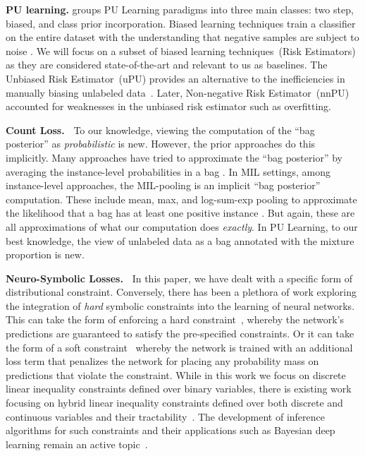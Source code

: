 \documentclass{article}
\begin{document}
\textbf{PU learning.}
\citet{bekker2020learning} groups PU Learning paradigms into three main classes: two step, biased, and class prior incorporation. Biased learning techniques train a classifier on the entire dataset with the understanding that negative samples are subject to noise \citep{bekker2020learning}. We will focus on a subset of biased learning techniques~(Risk Estimators) as they are considered state-of-the-art and relevant to us as baselines. The Unbiased Risk Estimator~(uPU) provides an alternative to the inefficiencies in manually biasing unlabeled data~\citep{plessis2014unbiased, pmlr-v37-plessis15}. Later, Non-negative Risk Estimator~(nnPU) \cite{kiryo2017positive} accounted for weaknesses in the unbiased risk estimator such as overfitting. 

\textbf{Count Loss.\ } To our knowledge, viewing the computation of the ``bag posterior'' as \emph{probabilistic} is new. However, the prior approaches do this implicitly. Many approaches have tried to approximate the ``bag posterior'' by averaging the instance-level probabilities in a bag \citep{ardehaly2017co, tsai2020learning}. In MIL settings, among instance-level approaches, the MIL-pooling is an implicit ``bag posterior'' computation. These include mean, max, and log-sum-exp pooling to approximate the likelihood that a bag has at least one positive instance \cite{wang2018revisiting}. But again, these are all approximations of what our computation does \emph{exactly}. In PU Learning, to our best knowledge, the view of unlabeled data as a bag annotated with the mixture proportion is new.

\textbf{Neuro-Symbolic Losses.\ } In this paper, we have dealt with a specific form of distributional constraint.
Conversely, there has been a plethora of work exploring the integration of \emph{hard} symbolic constraints
into the learning of neural networks.
This can take the form of enforcing a hard constraint~\citep{AhmedNeurIPS22}, whereby the network's
predictions are guaranteed to satisfy the pre-specified constraints. Or it can take the form of a soft constraint~\citep{xu2018semantic, manhaeve2018, AhmedArxiv21b, Ahmed2022neuro, AhmedAAAI22, AhmedAISTATS23} whereby the network is trained with an additional loss term that penalizes the network for placing any probability mass on predictions that violate the constraint.
While in this work we focus on discrete linear inequality constraints defined over binary variables, there is existing work focusing on hybrid linear inequality constraints defined over both discrete and continuous variables and their tractability~\citep{belle2015probabilistic,ZengTPM21,zeng2020probabilistic}. The development of inference algorithms for such constraints and their applications such as Bayesian deep learning remain an active topic~\citep{zeng2019efficient,kolb2019pywmi,zeng2020scaling, zeng2023collapsed}.
\end{document}

